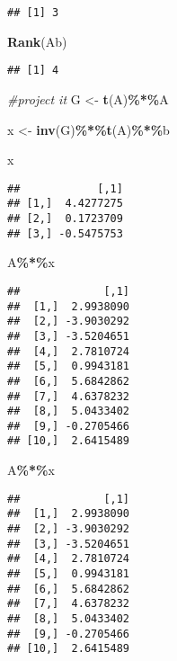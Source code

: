 \documentclass[
]{article}
\newenvironment{Shaded}{\begin{snugshade}}{\end{snugshade}}
\newcommand{\CommentTok}[1]{\textcolor[rgb]{0.56,0.35,0.01}{\textit{#1}}}
\newcommand{\FunctionTok}[1]{\textcolor[rgb]{0.13,0.29,0.53}{\textbf{#1}}}
\newcommand{\NormalTok}[1]{#1}
\newcommand{\OtherTok}[1]{\textcolor[rgb]{0.56,0.35,0.01}{#1}}
\newcommand{\SpecialCharTok}[1]{\textcolor[rgb]{0.81,0.36,0.00}{\textbf{#1}}}
\begin{document}
\begin{verbatim}
## [1] 3
\end{verbatim}

\begin{Shaded}
\begin{Highlighting}[]
\FunctionTok{Rank}\NormalTok{(Ab)}
\end{Highlighting}
\end{Shaded}

\begin{verbatim}
## [1] 4
\end{verbatim}

\begin{Shaded}
\begin{Highlighting}[]
\CommentTok{\#project it}
\NormalTok{G }\OtherTok{\textless{}{-}} \FunctionTok{t}\NormalTok{(A)}\SpecialCharTok{\%*\%}\NormalTok{A}

\NormalTok{x }\OtherTok{\textless{}{-}} \FunctionTok{inv}\NormalTok{(G)}\SpecialCharTok{\%*\%}\FunctionTok{t}\NormalTok{(A)}\SpecialCharTok{\%*\%}\NormalTok{b}

\NormalTok{x   }
\end{Highlighting}
\end{Shaded}

\begin{verbatim}
##            [,1]
## [1,]  4.4277275
## [2,]  0.1723709
## [3,] -0.5475753
\end{verbatim}

\begin{Shaded}
\begin{Highlighting}[]
\NormalTok{A}\SpecialCharTok{\%*\%}\NormalTok{x}
\end{Highlighting}
\end{Shaded}

\begin{verbatim}
##             [,1]
##  [1,]  2.9938090
##  [2,] -3.9030292
##  [3,] -3.5204651
##  [4,]  2.7810724
##  [5,]  0.9943181
##  [6,]  5.6842862
##  [7,]  4.6378232
##  [8,]  5.0433402
##  [9,] -0.2705466
## [10,]  2.6415489
\end{verbatim}

\begin{Shaded}
\begin{Highlighting}[]
\NormalTok{A}\SpecialCharTok{\%*\%}\NormalTok{x}
\end{Highlighting}
\end{Shaded}

\begin{verbatim}
##             [,1]
##  [1,]  2.9938090
##  [2,] -3.9030292
##  [3,] -3.5204651
##  [4,]  2.7810724
##  [5,]  0.9943181
##  [6,]  5.6842862
##  [7,]  4.6378232
##  [8,]  5.0433402
##  [9,] -0.2705466
## [10,]  2.6415489
\end{verbatim}
\end{document}
